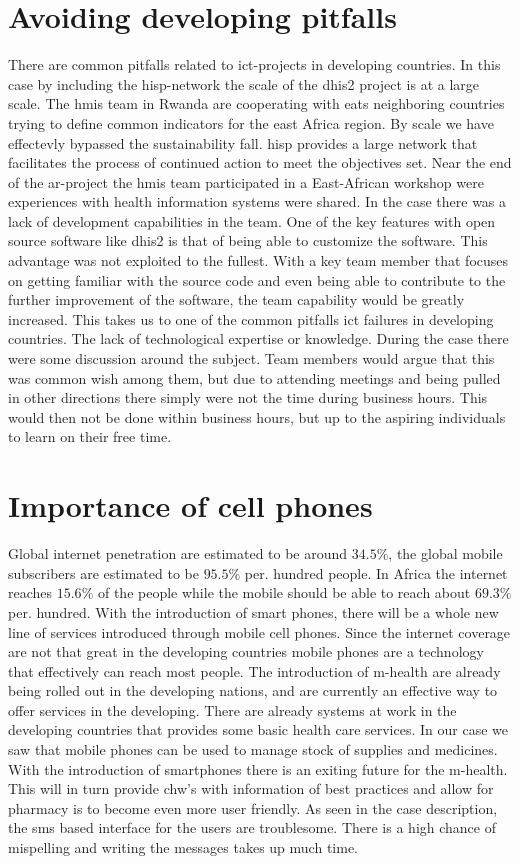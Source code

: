 \section{Avoiding developing pitfalls}
There are common pitfalls related to \gls{ict}-projects in developing countries. 
In this case by including the \gls{hisp}-network the scale of the \gls{dhis2} project is at a large scale. 
The \gls{hmis} team in Rwanda are cooperating with eats neighboring countries trying to define common indicators for the east Africa region.
By scale we have effectevly bypassed the sustainability fall. \gls{hisp} provides a large network that facilitates the process of continued action to meet the objectives set.
Near the end of the \gls{ar}-project the \gls{hmis} team participated in a East-African workshop were experiences with health information systems were shared.
In the case there was a lack of development capabilities in the team. 
One of the key features with open source software like \gls{dhis2} is that of being able to customize the software.
This advantage was not exploited to the fullest. 
With a key team member that focuses on getting familiar with the source code and even being able to contribute to the further improvement of the software, the team capability would be greatly increased. 
This takes us to one of the common pitfalls \gls{ict} failures in developing countries.
The lack of technological expertise or knowledge. 
During the case there were some discussion around the subject. 
Team members would argue that this was common wish among them, but due to attending meetings and being pulled in other directions there simply were not the time during business hours. 
This would then not be done within business hours, but up to the aspiring individuals to learn on their free time.

\section{Importance of cell phones}
Global internet penetration are estimated to be around $34.5\%$, the global mobile subscribers are estimated to be $95.5\%$ per. hundred people. 
In Africa the internet reaches $15.6\%$ of the people while the mobile should be able to reach about $69.3\%$ per. hundred.
With the introduction of smart phones, there will be a whole new line of services introduced through mobile cell phones.
Since the internet coverage are not that great in the developing countries mobile phones are a technology that effectively can reach most people. 
The introduction of m-health are already being rolled out in the developing nations, and are currently an effective way to offer services in the developing.
There are already systems at work in the developing countries that provides some basic health care services.
In our case we saw that mobile phones can be used to manage stock of supplies and medicines. 
With the introduction of smartphones there is an exiting future for the m-health. 
This will in turn provide \gls{chw}'s with information of best practices and allow for pharmacy \gls{is} to become even more user friendly.
As seen in the case description, the \gls{sms} based interface for the users are troublesome. 
There is a high chance of mispelling and writing the messages takes up much time. 


